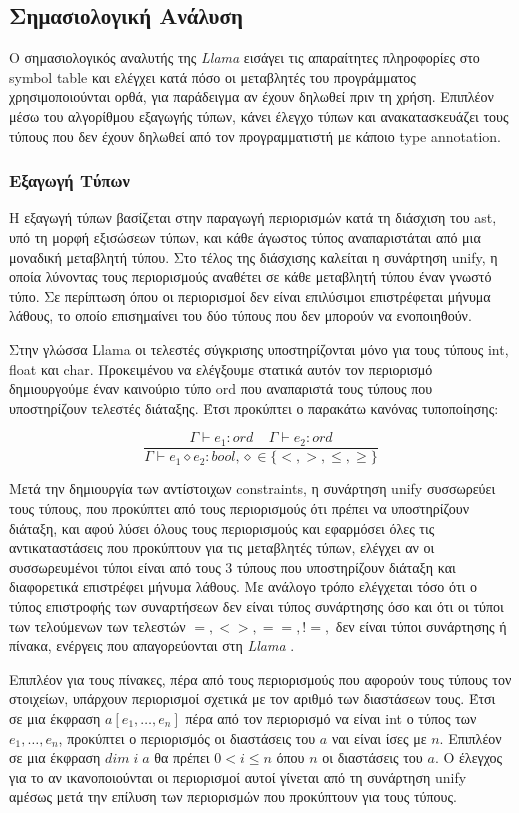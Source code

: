 \documentclass[12pt]{article}
\newcommand{\Llama}{\textit{Llama }}
\begin{document}
\subsection{Σημασιολογική Ανάλυση}
Ο σημασιολογικός αναλυτής της \Llama εισάγει τις απαραίτητες πληροφορίες στο symbol table και ελέγχει κατά πόσο οι μεταβλητές του προγράμματος χρησιμοποιούνται ορθά, για παράδειγμα αν έχουν δηλωθεί πριν τη χρήση. Επιπλέον μέσω του αλγορίθμου εξαγωγής τύπων, κάνει έλεγχο τύπων και ανακατασκευάζει τους τύπους που δεν έχουν δηλωθεί από τον προγραμματιστή με κάποιο type annotation.


\subsubsection{Εξαγωγή Τύπων}
Η εξαγωγή τύπων βασίζεται στην παραγωγή περιορισμών κατά τη διάσχιση του ast, υπό τη μορφή εξισώσεων τύπων, και κάθε άγωστος τύπος αναπαριστάται από μια μοναδική μεταβλητή τύπου. Στο τέλος της διάσχισης καλείται η συνάρτηση unify, η οποία λύνοντας τους περιορισμούς αναθέτει σε κάθε μεταβλητή τύπου έναν γνωστό τύπο. Σε περίπτωση όπου οι περιορισμοί δεν είναι επιλύσιμοι επιστρέφεται μήνυμα λάθους, το οποίο επισημαίνει του δύο τύπους που δεν μπορούν να ενοποιηθούν.


Στην γλώσσα Llama οι τελεστές σύγκρισης υποστηρίζονται μόνο για τους τύπους int, float και char. Προκειμένου να ελέγξουμε στατικά αυτόν τον περιορισμό δημιουργούμε έναν καινούριο τύπο ord που αναπαριστά τους τύπους που υποστηρίζουν τελεστές διάταξης. Έτσι προκύπτει ο παρακάτω κανόνας τυποποίησης:

$$\frac{\Gamma  \vdash e_1 : ord \;\;\;\; \Gamma  \vdash e_2 : ord  }{\Gamma  \vdash e_1 \diamond e_2 : bool,\diamond \in \lbrace <,>, \leq, \geq\rbrace}$$


Μετά την δημιουργία των αντίστοιχων constraints, η συνάρτηση unify συσσωρεύει τους τύπους, που προκύπτει από τους περιορισμούς ότι πρέπει να υποστηρίζουν διάταξη, και αφού λύσει όλους τους περιορισμούς και εφαρμόσει όλες τις αντικαταστάσεις που προκύπτουν για τις μεταβλητές τύπων, ελέγχει αν οι συσσωρευμένοι τύποι είναι από τους 3 τύπους που υποστηρίζουν διάταξη και διαφορετικά επιστρέφει μήνυμα λάθους. Με ανάλογο τρόπο ελέγχεται τόσο ότι ο τύπος επιστροφής των συναρτήσεων δεν είναι τύπος συνάρτησης όσο και ότι οι τύποι των τελούμενων των τελεστών $=,<>,==,!=,$ δεν είναι τύποι συνάρτησης ή πίνακα, ενέργεις που απαγορεύονται στη \Llama. 

Επιπλέον για τους πίνακες, πέρα από τους περιορισμούς που αφορούν τους τύπους τον στοιχείων, υπάρχουν περιορισμοί σχετικά με τον αριθμό των διαστάσεων τους. Έτσι σε μια έκφραση $a[e_1, \ldots, e_n]$ πέρα από τον περιορισμό να είναι int ο τύπος των $e_1, \ldots, e_n$, προκύπτει ο περιορισμός οι διαστάσεις του $a$ ναι είναι ίσες με $n$. Επιπλέον σε μια έκφραση $dim \; i \; a$ θα πρέπει $0 < i \leq n$ όπου $n$ οι διαστάσεις του $a$. Ο έλεγχος για το αν ικανοποιούνται οι περιορισμοί αυτοί γίνεται από τη συνάρτηση unify αμέσως μετά την επίλυση των περιορισμών που προκύπτουν για τους τύπους.
\end{document}
